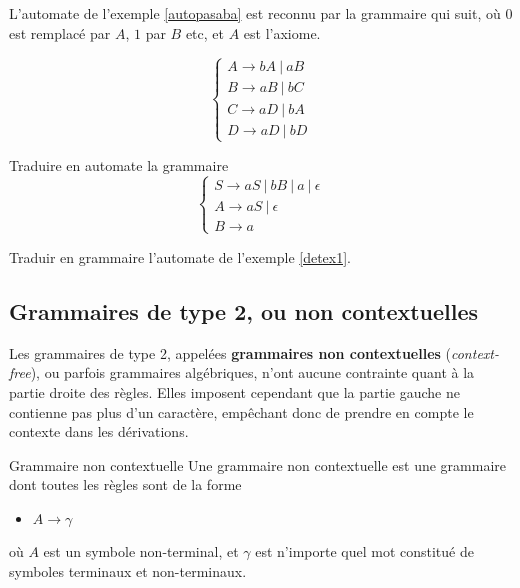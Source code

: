 \begin{example}
L'automate de l'exemple \ref{autopasaba} est reconnu par la grammaire qui suit, où $0$ est remplacé par $A$, $1$ par $B$ etc, et $A$ est l'axiome.

\[
\begin{cases}
A \rightarrow bA~|~aB \\
B \rightarrow aB~|~bC \\
C \rightarrow aD~|~bA \\
D \rightarrow aD~|~bD
\end{cases}
\]

\end{example}

\begin{exercice}
Traduire en automate la grammaire 
\[
\begin{cases}
S \rightarrow aS~|~bB~|~a~|~\epsilon \\
A \rightarrow aS~|~\epsilon \\
B \rightarrow a
\end{cases}
\]

\end{exercice}

\begin{exercice}
Traduir en grammaire l'automate de l'exemple \ref{detex1}.
\end{exercice}



\subsection{Grammaires de type 2, ou non contextuelles}

Les grammaires de type 2, appelées \textbf{grammaires non contextuelles} (\textit{context-free}), ou parfois grammaires algébriques, n'ont aucune contrainte quant à la partie droite des règles. Elles imposent cependant que la partie gauche ne contienne pas plus d'un caractère, empêchant donc de prendre en compte le contexte dans les dérivations.

\begin{definition}{Grammaire non contextuelle}{}
Une grammaire non contextuelle est une grammaire dont toutes les règles sont de la forme 
\begin{itemize}
\item[] $A \rightarrow \gamma$
\end{itemize}
où $A$ est un symbole non-terminal, et $\gamma$ est n'importe quel mot constitué de symboles terminaux et non-terminaux.
\end{definition}

